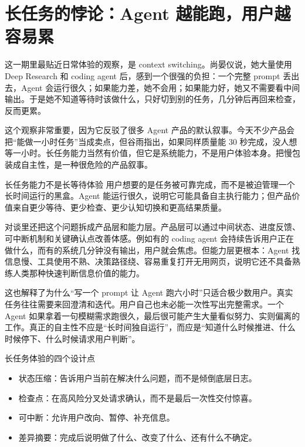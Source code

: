 \documentclass[a4paper]{article}
\begin{document}
\section{长任务的悖论：Agent 越能跑，用户越容易累}

这一期里最贴近日常体验的观察，是 context switching。尚晏仪说，她大量使用 Deep Research 和 coding agent 后，感到一个很强的负担：一个完整 prompt 丢出去，Agent 会运行很久；如果能力差，她不会用；如果能力好，她又不需要看中间输出。于是她不知道等待时该做什么，只好切到别的任务，几分钟后再回来检查，反而更累。

这个观察非常重要，因为它反驳了很多 Agent 产品的默认叙事。今天不少产品会把“能做一小时任务”当成卖点，但谷雨指出，如果同样质量能 30 秒完成，没人想等一小时。长任务能力当然有价值，但它是系统能力，不是用户体验本身。把慢包装成自主性，是一种很危险的产品叙事。

\begin{importantbox}{长任务能力不是长等待体验}
用户想要的是任务被可靠完成，而不是被迫管理一个长时间运行的黑盒。Agent 能运行很久，说明它可能具备自主执行能力；但产品价值来自更少等待、更少检查、更少认知切换和更高结果质量。
\end{importantbox}

对谈里还把这个问题拆成产品层和能力层。产品层可以通过中间状态、进度反馈、可中断机制和关键确认点改善体感。例如有的 coding agent 会持续告诉用户正在做什么，而有的系统几分钟没有输出，用户就会焦虑。但能力层更根本：Agent 找信息慢、工具使用不熟、决策路径绕、容易重复打开无用网页，说明它还不具备熟练人类那种快速判断信息价值的能力。

这也解释了为什么“写一个 prompt 让 Agent 跑六小时”只适合极少数用户。真实任务往往需要来回澄清和迭代。用户自己也未必能一次性写出完整需求。一个 Agent 如果拿着一句模糊需求跑很久，最后很可能产生大量看似努力、实则偏离的工作。真正的自主性不应是“长时间独自运行”，而应是“知道什么时候推进、什么时候停下、什么时候请求用户判断”。

\begin{knowledgebox}{长任务体验的四个设计点}
\begin{itemize}
  \item 状态压缩：告诉用户当前在解决什么问题，而不是倾倒底层日志。
  \item 检查点：在高风险分叉处请求确认，而不是最后一次性交付惊喜。
  \item 可中断：允许用户改向、暂停、补充信息。
  \item 差异摘要：完成后说明做了什么、改变了什么、还有什么不确定。
\end{itemize}
\end{knowledgebox}
\end{document}
